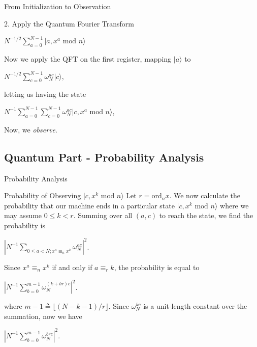 \documentclass{beamer}
\newcommand{\mrm}[1]{\mathrm{#1}}
\renewcommand{\:}{\text{ }}
\renewcommand{\mod}{\text{ mod }}
\newcommand{\ord}[1]{\mrm{ord}_{#1}}
\begin{document}
    \begin{frame}{From Initialization to Observation}
        \begin{block}{2. Apply the Quantum Fourier Transform}
            \centerline{$N^{-1/2}\sum_{a=0}^{N-1} \vert a, x^a \mod n \rangle$}\vspace*{.5em}
            Now we apply the QFT on the first register, mapping $\vert a \rangle$ to \\[.5em]
            \centerline{$N^{-1/2}\sum_{c=0}^{N-1} \omega_N^{ac} \vert c \rangle$,}\vspace*{.5em}
            letting us having the state \\[.5em]
            \centerline{$N^{-1} \sum_{a=0}^{N-1} \sum_{c=0}^{N-1} \omega_N^{ac} \vert c, x^a \mod n \rangle$,}\vspace*{.5em}
            Now, we \textit{observe}.
        \end{block}
    \end{frame}
    
    \subsection{Quantum Part - Probability Analysis}
    \begin{frame}{Probability Analysis}
        \begin{block}{Probability of Observing $\vert c, x^k \mod n \rangle$}
            \small
            Let $r = \ord{n} x$. We now calculate the probability that
            our machine ends in a particular state $\vert c, x^k \mod n \rangle$ where we may assume $0 \leq k < r$.
            Summing over all $(a, c)$ to reach the state, we find the probability is \\[.5em] 
            \centerline{\normalsize $\left| N^{-1} \sum_{0 \leq a < N; x^a \equiv_n x^k} \omega_N^{ac} \right|^2$.} \vspace*{.5em}
            Since $x^a \equiv_n x^k$ if and only if $a \equiv_r k$, the probability is equal to \\[.5em] 
            \centerline{\normalsize $\left| N^{-1} \sum_{b=0}^{m-1} \omega_N^{(k+br)c} \right|^2$.} \vspace*{.5em}
            where $m-1 \triangleq \lfloor (N-k-1)/r \rfloor$. Since $\omega_N^{kc}$ is a unit-length constant over the summation, now we have \\[.5em]
            \centerline{\normalsize $\left| N^{-1} \sum_{b=0}^{m-1} \omega_N^{brc} \right|^2$.} \vspace*{.5em}
        \end{block}
    \end{frame}
\end{document}
